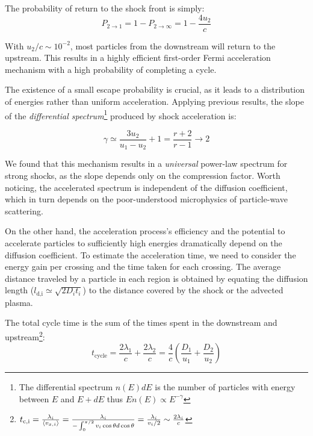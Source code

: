 The probability of return to the shock front is simply:
%
\begin{equation}
P_{2 \rightarrow 1} = 1 - P_{2 \rightarrow \infty} = 1 - \frac{4 u_2}{c}
\end{equation}

With \( u_2/c \sim 10^{-2} \), most particles from the downstream will return to the upstream. This results in a highly efficient first-order Fermi acceleration mechanism with a high probability of completing a cycle.

The existence of a small escape probability is crucial, as it leads to a distribution of energies rather than uniform acceleration. Applying previous results, the slope of the \emph{differential spectrum}\footnote{The differential spectrum \( n(E)dE \) is  the number of particles with energy between \( E \) and \( E + dE \) thus \( E n(E) \propto E^{-\gamma} \)} produced by shock acceleration is:
%
\begin{remark}
\begin{equation}
\gamma \simeq \frac{3 u_2}{u_1 - u_2} + 1 = \frac{r + 2}{r - 1} \rightarrow 2
\end{equation}
\end{remark}

We found that this mechanism results in a \emph{universal} power-law spectrum for strong shocks, as the slope depends only on the compression factor. Worth noticing, the accelerated spectrum is independent of the diffusion coefficient, which in turn depends on the poor-understood microphysics of particle-wave scattering.

On the other hand, the acceleration process's efficiency and the potential to accelerate particles to sufficiently high energies dramatically depend on the diffusion coefficient. 
%
To estimate the acceleration time, we need to consider the energy gain per crossing and the time taken for each crossing. %
The average distance traveled by a particle in each region is obtained by equating the diffusion length (\( l_{\text{d,i}} \simeq \sqrt{2 D_i t_i} \)) to the distance covered by the shock or the advected plasma.

The total cycle time is the sum of the times spent in the downstream and upstream\footnote{$
t_{\rm c, i} = \frac{\lambda_i}{\langle v_{x,i} \rangle} = \frac{\lambda_i}{-\int_0^{\pi/2} v_i \cos \theta d\cos\theta} = \frac{\lambda_i}{v_i / 2} \sim \frac{2\lambda_i}{c}$}:
%
\begin{equation}
t_{\text{cycle}} = \frac{2\lambda_1}{c} + \frac{2\lambda_2}{c} = \frac{4}{c} \left(\frac{D_1}{u_1} + \frac{D_2}{u_2}\right)
\end{equation}

